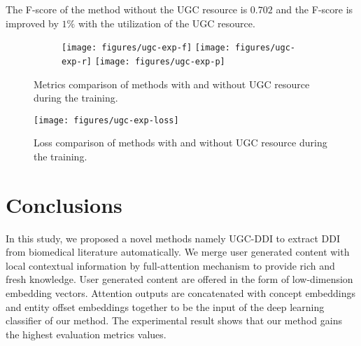\documentclass[conference]{IEEEtran}
\begin{document}
The F-score of the method without the UGC resource is $0.702$ and the F-score is improved by $1\%$ with the utilization of the UGC resource.

\begin{figure*}[htb]
    \centering
    \begin{subfigure}[b]{\textwidth}
    \centering
        \texttt{[image: figures/ugc-exp-f]}%
        \texttt{[image: figures/ugc-exp-r]}
        \texttt{[image: figures/ugc-exp-p]}%
    \end{subfigure}
    \caption{Metrics comparison of methods with and without UGC resource during the training.}
    \label{fig:ugc-exp}
\end{figure*}

\begin{figure}[ht]
	\centering
	\texttt{[image: figures/ugc-exp-loss]}
	\caption{Loss comparison of methods with and without UGC resource during the training.}
	\label{fig:ugc-loss}
\end{figure}

\section{Conclusions}
\label{sec:conclusions}

In this study, we proposed a novel methods namely UGC-DDI to extract DDI from biomedical literature automatically.
We merge user generated content with local contextual information by full-attention mechanism to provide rich and fresh knowledge.
User generated content are offered in the form of low-dimension embedding vectors.
Attention outputs are concatenated with concept embeddings and entity offset embeddings together to be the input of the deep learning classifier of our method.
The experimental result shows that our method gains the highest evaluation metrics values.



\end{document}
